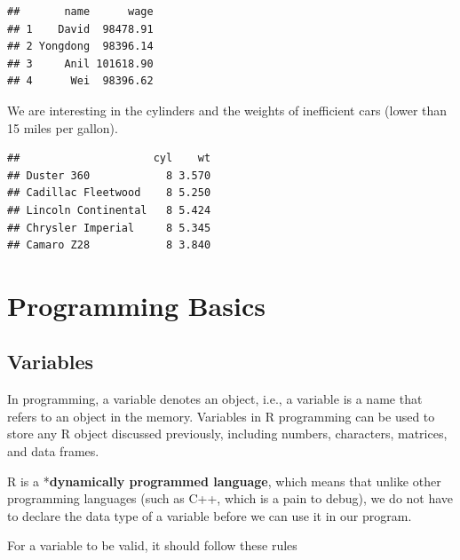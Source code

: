 \documentclass[
  11pt,
]{book}
\newenvironment{Shaded}{\begin{snugshade}}{\end{snugshade}}
\newcommand{\CommentTok}[1]{\textcolor[rgb]{0.56,0.35,0.01}{\textit{#1}}}
\newcommand{\DecValTok}[1]{\textcolor[rgb]{0.00,0.00,0.81}{#1}}
\newcommand{\FunctionTok}[1]{\textcolor[rgb]{0.00,0.00,0.00}{#1}}
\newcommand{\NormalTok}[1]{#1}
\newcommand{\OtherTok}[1]{\textcolor[rgb]{0.56,0.35,0.01}{#1}}
\newcommand{\SpecialCharTok}[1]{\textcolor[rgb]{0.00,0.00,0.00}{#1}}
\newcommand{\StringTok}[1]{\textcolor[rgb]{0.31,0.60,0.02}{#1}}
\begin{document}
\begin{verbatim}
##       name      wage
## 1    David  98478.91
## 2 Yongdong  98396.14
## 3     Anil 101618.90
## 4      Wei  98396.62
\end{verbatim}

We are interesting in the cylinders and the weights of inefficient cars (lower than 15 miles per gallon).

\begin{Shaded}
\end{Shaded}

\begin{verbatim}
##                     cyl    wt
## Duster 360            8 3.570
## Cadillac Fleetwood    8 5.250
## Lincoln Continental   8 5.424
## Chrysler Imperial     8 5.345
## Camaro Z28            8 3.840
\end{verbatim}

\hypertarget{programming-basics}{%
\chapter{Programming Basics}\label{programming-basics}}

\hypertarget{variables}{%
\section{Variables}\label{variables}}

In programming, a variable denotes an object, i.e., a variable is a name that refers to an object in the memory. Variables in R programming can be used to store any R object discussed previously, including numbers, characters, matrices, and data frames.

R is a *\textbf{dynamically programmed language}, which means that unlike other programming languages (such as C++, which is a pain to debug), we do not have to declare the data type of a variable before we can use it in our program.

For a variable to be valid, it should follow these rules
\end{document}
